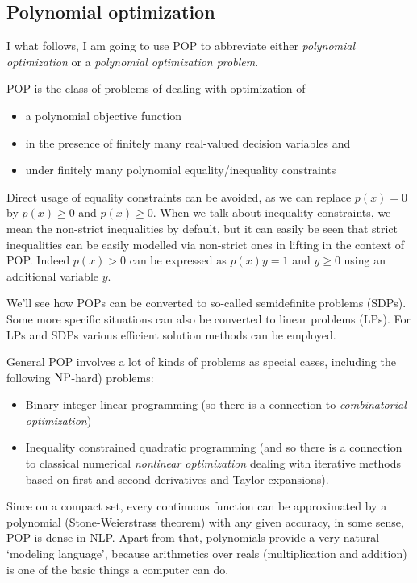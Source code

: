 \subsection{Polynomial optimization}

I what follows, I am going to use POP to abbreviate either \emph{polynomial optimization} or a \emph{polynomial optimization problem}. 

POP is the class of problems of dealing with optimization of
\begin{itemize}
	\item a polynomial objective function 
	\item in the presence of finitely many real-valued decision variables and 
	\item under finitely many polynomial equality/inequality constraints
\end{itemize}

Direct usage of equality constraints can be avoided, as we can replace $p(x)=0$ by $p(x) \ge 0$ and $p(x) \ge 0$. When we talk about inequality constraints, we mean the non-strict inequalities by default, but it can easily be seen that strict inequalities can be easily modelled via non-strict ones in lifting in the context of POP. Indeed $p(x) >0$ can be expressed as $p(x) y = 1$ and $y \ge 0$ using an additional variable $y$. 

We'll see how POPs can be converted to so-called semidefinite problems (SDPs). Some more specific situations can also be converted to linear problems (LPs). For LPs and SDPs various efficient solution methods can be employed. 

General POP involves a lot of kinds of problems as special cases, including the following $\operatorname{NP}$-hard) problems:
\begin{itemize}
	\item Binary integer linear programming (so there is a connection to \emph{combinatorial optimization})
	\item Inequality constrained quadratic programming (and so there is a connection to classical numerical \emph{nonlinear optimization} dealing with iterative methods based on first and second derivatives and Taylor expansions). 
\end{itemize}

Since on a compact set, every continuous function can be approximated by a polynomial (Stone-Weierstrass theorem) with any given accuracy, in some sense, POP is dense in NLP. Apart from that, polynomials provide a very natural `modeling language', because arithmetics over reals (multiplication and addition) is one of the basic things a computer can do.  

